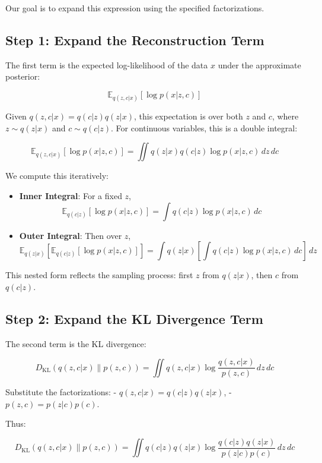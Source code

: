 \documentclass[12pt]{article}
\numberwithin{equation}{section}
\begin{document}
Our goal is to expand this expression using the specified factorizations.

\subsection{Step 1: Expand the Reconstruction Term}

The first term is the expected log-likelihood of the data \( x \) under the approximate posterior:

\[
\mathbb{E}_{q(z, c | x)} \left[ \log p(x | z, c) \right]
\]

Given \( q(z, c | x) = q(c | z) q(z | x) \), this expectation is over both \( z \) and \( c \), where \( z \sim q(z | x) \) and \( c \sim q(c | z) \). For continuous variables, this is a double integral:

\[
\mathbb{E}_{q(z, c | x)} \left[ \log p(x | z, c) \right] = \iint q(z | x) q(c | z) \log p(x | z, c) \, dz \, dc
\]

We compute this iteratively:
\begin{itemize}
    \item \textbf{Inner Integral}: For a fixed \( z \),
    \[
    \mathbb{E}_{q(c | z)} \left[ \log p(x | z, c) \right] = \int q(c | z) \log p(x | z, c) \, dc
    \]
    \item \textbf{Outer Integral}: Then over \( z \),
    \[
    \mathbb{E}_{q(z | x)} \left[ \mathbb{E}_{q(c | z)} \left[ \log p(x | z, c) \right] \right] = \int q(z | x) \left[ \int q(c | z) \log p(x | z, c) \, dc \right] \, dz
    \]
\end{itemize}

This nested form reflects the sampling process: first \( z \) from \( q(z | x) \), then \( c \) from \( q(c | z) \).

\subsection{Step 2: Expand the KL Divergence Term}

The second term is the KL divergence:

\[
D_{\text{KL}}(q(z, c | x) \| p(z, c)) = \iint q(z, c | x) \log \frac{q(z, c | x)}{p(z, c)} \, dz \, dc
\]

Substitute the factorizations:
- \( q(z, c | x) = q(c | z) q(z | x) \),
- \( p(z, c) = p(z | c) p(c) \).

Thus:

\[
D_{\text{KL}}(q(z, c | x) \| p(z, c)) = \iint q(c | z) q(z | x) \log \frac{q(c | z) q(z | x)}{p(z | c) p(c)} \, dz \, dc
\]
\end{document}
